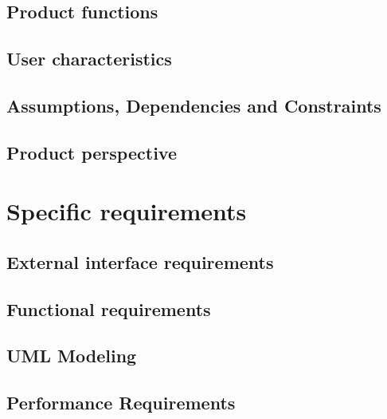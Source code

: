\documentclass[12pt, a4paper]{report}
\begin{document}
\section{Product functions}


\section{User characteristics}


\section{Assumptions, Dependencies and Constraints}


\section{Product perspective}


%

\chapter{Specific requirements}
\label{ch:requirements}

\section{External interface requirements}


\section{Functional requirements}


\section{UML Modeling}



\section{Performance Requirements}

\end{document}
